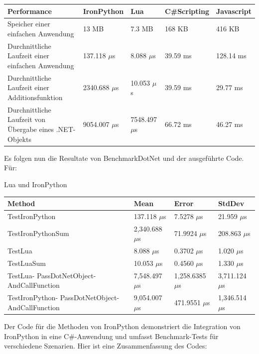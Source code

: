 \begin{table}[H] 
    \begin{tabular}{|p{3cm}|p{3cm}|p{3cm}|p{3cm}|p{3cm}|}
        \hline
        Performance & IronPython & Lua & C\#Scripting & Javascript\\ \hline
        Speicher einer einfachen Anwendung & 13 MB & 7.3 MB & 168 KB & 416 KB  \\ \hline
        Durchnittliche Laufzeit einer einfachen Anwendung & 137.118 $\mu$s & 8.088 $\mu$s & 39.59 ms & 128.14 ms\\ \hline
        Durchnittliche Laufzeit einer Additionsfunktion & 2340.688 $\mu$s & 10.053 $\mu$s &39.59 ms &  29.77 ms \\ \hline
        Durchnittliche Laufzeit von Übergabe eines .NET-Objekts & 9054.007 $\mu$s & 7548.497 $\mu$s &  66.72 ms & 46.27 ms  \\ \hline
    \end{tabular}
\end{table}

\newpage
Es folgen nun die Resultate von BenchmarkDotNet und der ausgeführte Code.\\

Für:

Lua und IronPython
     \begin{table}[H]
            \begin{tabular}{|p{3.5cm}|p{3cm}|p{3cm}|p{3cm}|}
            \hline
                Method &   Mean &   Error & StdDev \\ \hline
                TestIronPython & 137.118 $\mu$s & 7.5278 $\mu$s & 21.959 $\mu$s \\ \hline
                TestIronPythonSum & 2,340.688 $\mu$s & 71.9924 $\mu$s & 208.863 $\mu$s \\ \hline
                TestLua & 8.088 $\mu$s & 0.3702 $\mu$s & 1.020 $\mu$s \\ \hline
                TestLuaSum & 10.053 $\mu$s & 0.4560 $\mu$s & 1.330 $\mu$s \\ \hline
                TestLua-
                PassDotNetObject- 
                AndCallFunction & 7,548.497 $\mu$s & 1,258.6385 $\mu$s & 3,711.124 $\mu$s \\ \hline
                TestIronPython-
                PassDotNetObject- 
                AndCallFunction & 9,054.007 $\mu$s & 471.9551 $\mu$s & 1,346.514 $\mu$s \\ \hline
            \end{tabular}
    \end{table}
Der Code für die Methoden von IronPython demonstriert die Integration von IronPython in eine C\#-Anwendung und umfasst Benchmark-Tests für verschiedene Szenarien. Hier ist eine Zusammenfassung des Codes:

